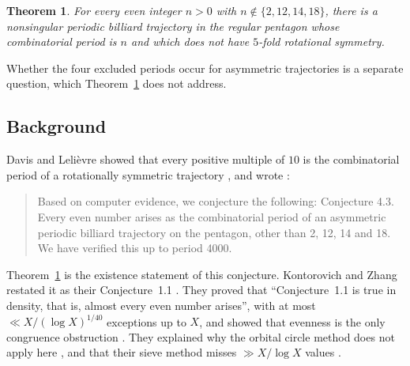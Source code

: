 \documentclass[11pt]{article}
\newtheorem{theorem}{Theorem}[section]
\theoremstyle{definition}
\theoremstyle{remark}
\begin{document}
\begin{theorem}\label{thm:main}
For every even integer $n>0$ with $n\notin\{2,12,14,18\}$, there is a
nonsingular periodic billiard trajectory in the regular pentagon whose
combinatorial period is $n$ and which does not have $5$-fold rotational
symmetry.
\end{theorem}

Whether the four excluded periods occur for asymmetric trajectories is a
separate question, which Theorem~\ref{thm:main} does not address.

\subsection{Background}
Davis and Lelièvre showed that every positive multiple of $10$ is the
combinatorial period of a rotationally symmetric trajectory
\cite[Proposition~4.2]{DL}, and wrote \cite[\S4.1]{DL}:

\begin{quote}
Based on computer evidence, we conjecture the following:
Conjecture 4.3. Every even number arises as the combinatorial period of
an asymmetric periodic billiard trajectory on the pentagon, other than 2,
12, 14 and 18. We have verified this up to period 4000.
\end{quote}

Theorem~\ref{thm:main} is the existence statement of this conjecture.
Kontorovich and Zhang restated it as their Conjecture~1.1
\cite[\S1]{KZ}. They proved \cite[Theorem~1.2]{KZ} that ``Conjecture~1.1
is true in density, that is, almost every even number arises'', with at
most $\ll X/(\log X)^{1/40}$ exceptions up to $X$, and showed that evenness
is the only congruence obstruction \cite[Theorem~1.4]{KZ}. They explained
why the orbital circle method does not apply here \cite[Remark~1.5]{KZ},
and that their sieve method misses $\gg X/\log X$ values
\cite[Remark~4.5]{KZ}.
\end{document}
